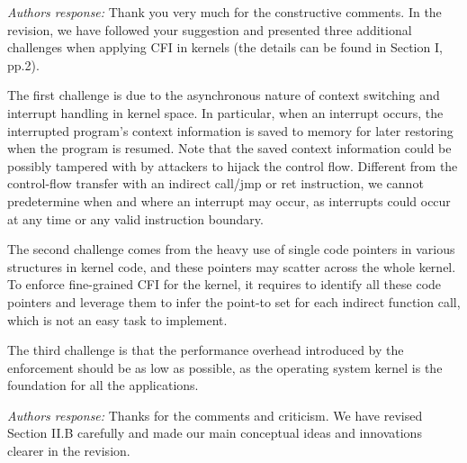 \documentclass[oneside, 11pt]{article}
\begin{document}
{\em Authors response:}
Thank you very much for the constructive comments. In the revision, we
have followed your suggestion and presented three additional challenges when
applying CFI in kernels (the details can be found in Section I, pp.2).

The first challenge is due to the asynchronous nature of context switching
and interrupt handling in kernel space. In particular, when an interrupt
occurs, the interrupted program's context information is saved to memory
for later restoring when the program is resumed. Note that the saved
context information could be possibly tampered with by attackers to hijack
the control flow. Different from the control-flow transfer with an
indirect call/jmp or ret instruction, we cannot predetermine when and where
an interrupt may occur, as interrupts could occur at any time or any valid
instruction boundary.

The second challenge comes from the heavy use of single code pointers in
various structures in kernel code, and these pointers may scatter across
the whole kernel. To enforce fine-grained CFI for the
kernel, it requires to identify all these code pointers and leverage them to
infer the point-to set for each indirect function call, which is not an
easy task to implement.

The third challenge is that the performance overhead introduced by the
enforcement should be as low as possible, as the operating system kernel is
the foundation for all the applications.




\smallskip
\smallskip
\smallskip
{}

{\em Authors response:}
Thanks for the comments and criticism. We have revised Section II.B carefully
and made our main conceptual ideas and innovations clearer in the revision.
\end{document}
